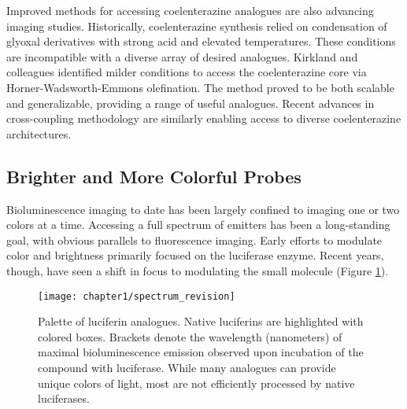Improved methods for accessing coelenterazine analogues
are also advancing imaging studies. Historically, coelenterazine
synthesis relied on condensation of glyoxal derivatives with
strong acid and elevated temperatures. These conditions are
incompatible with a diverse array of desired analogues. Kirkland
and colleagues identified milder conditions to access the
coelenterazine core via Horner-Wadsworth-Emmons olefination.\cite{Shakhmin:2016bd}
The method proved to be both scalable and generalizable,
providing a range of useful analogues. Recent advances
in cross-coupling methodology are similarly enabling access to
diverse coelenterazine architectures.\cite{Hosoya:2015iu}
\subsection*{Brighter and More Colorful Probes}
Bioluminescence imaging to date has been largely confined to imaging one or
two colors at a time. Accessing a full spectrum of emitters has
been a long-standing goal, with obvious parallels to
fluorescence imaging. Early efforts to modulate color and
brightness primarily focused on the luciferase enzyme.\cite{RN26} Recent
years, though, have seen a shift in focus to modulating the small
molecule (Figure \ref{fig:luc_spectrum}).
\begin{figure}[htbp]
\texttt{[image: chapter1/spectrum\_revision]}
\centering
\caption[Palette of luciferin analogues]{Palette of luciferin analogues. Native luciferins are highlighted with colored boxes. Brackets denote the wavelength (nanometers) of
maximal bioluminescence emission observed upon incubation of the compound with luciferase. While many analogues can provide unique colors of
light, most are not efficiently processed by native luciferases.}
  \label{fig:luc_spectrum}
\end{figure}


